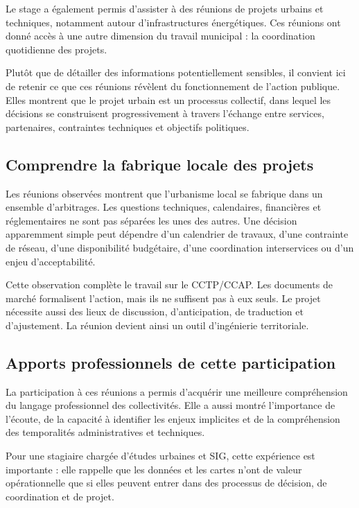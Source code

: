 \documentclass[11pt,a4paper]{report}
\begin{document}
Le stage a également permis d'assister à des réunions de projets urbains et techniques, notamment autour d'infrastructures énergétiques. Ces réunions ont donné accès à une autre dimension du travail municipal : la coordination quotidienne des projets.

Plutôt que de détailler des informations potentiellement sensibles, il convient ici de retenir ce que ces réunions révèlent du fonctionnement de l'action publique. Elles montrent que le projet urbain est un processus collectif, dans lequel les décisions se construisent progressivement à travers l'échange entre services, partenaires, contraintes techniques et objectifs politiques.

\subsection{Comprendre la fabrique locale des projets}

Les réunions observées montrent que l'urbanisme local se fabrique dans un ensemble d'arbitrages. Les questions techniques, calendaires, financières et réglementaires ne sont pas séparées les unes des autres. Une décision apparemment simple peut dépendre d'un calendrier de travaux, d'une contrainte de réseau, d'une disponibilité budgétaire, d'une coordination interservices ou d'un enjeu d'acceptabilité.

Cette observation complète le travail sur le CCTP/CCAP. Les documents de marché formalisent l'action, mais ils ne suffisent pas à eux seuls. Le projet nécessite aussi des lieux de discussion, d'anticipation, de traduction et d'ajustement. La réunion devient ainsi un outil d'ingénierie territoriale.

\subsection{Apports professionnels de cette participation}

La participation à ces réunions a permis d'acquérir une meilleure compréhension du langage professionnel des collectivités. Elle a aussi montré l'importance de l'écoute, de la capacité à identifier les enjeux implicites et de la compréhension des temporalités administratives et techniques.

Pour une stagiaire chargée d'études urbaines et SIG, cette expérience est importante : elle rappelle que les données et les cartes n'ont de valeur opérationnelle que si elles peuvent entrer dans des processus de décision, de coordination et de projet.
\end{document}
